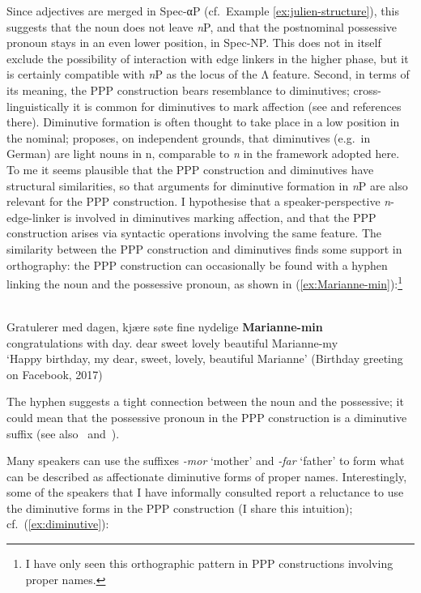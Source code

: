 \documentclass[output=paper]{langsci/langscibook}
\begin{document}
\noindent Since adjectives are merged in Spec-α{}P (cf.\ Example
\eqref{ex:julien-structure}), this suggests that the noun does not leave
\emph{n}P, and that the postnominal possessive pronoun stays in an even lower
position, in Spec-NP.  This does not in itself  exclude the possibility of
interaction with edge linkers in the higher phase, but it is certainly
compatible with \emph{n}P as  the locus of the
\textsc{Λ} feature.  Second, in terms
of its meaning, the PPP construction bears  resemblance to diminutives;
cross-linguistically it is common for diminutives to mark affection  (see
\citealt{jurafsky1996diminutives} and references there).  Diminutive
formation is often thought to take place in a low position in the nominal;
\citet{wiltschko2006diminutives} proposes, on independent grounds, that
diminutives (e.g.\ in German) are light nouns in n, comparable to \emph{n} in
the framework adopted here. To me it seems plausible that the PPP construction
and diminutives have structural similarities, so that arguments for diminutive
formation in \emph{n}P are also relevant for the PPP construction. I
hypothesise that a speaker-perspective
\emph{n}-edge-linker is involved in diminutives marking affection, and  that
the PPP construction arises via syntactic operations involving the same
feature. The similarity between the PPP construction and diminutives finds some
support in orthography: the PPP construction can occasionally  be found with a
hyphen linking the noun and the possessive pronoun, as shown in
(\ref{ex:Marianne-min}):\footnote{I have only seen this orthographic pattern in
PPP constructions involving proper names.}

\ea\label{ex:Marianne-min} \\
	\gll 	Gratulerer med dagen, kjære søte fine nydelige \textbf{Marianne-min}\\
	congratulations with day.\Def{} dear sweet lovely beautiful Marianne-my\\
	\glt `Happy birthday, my dear, sweet, lovely, beautiful Marianne'
	 (Birthday greeting on Facebook, 2017)
\z

\noindent The hyphen suggests a tight connection between the noun and the
possessive; it could mean that the possessive pronoun in the \gls{PPP} construction
is a diminutive suffix (see also~\citealt{Lodrup2011}
and~\citealt{Svenonius2017}).

Many  speakers can use the suffixes \emph{-mor} `mother' and
\emph{-far} `father' to  form what can be described as affectionate diminutive
forms of proper names. Interestingly, some of the speakers that I have
informally consulted  report a reluctance to use the diminutive forms in the
PPP construction (I share this intuition); cf.\
(\ref{ex:diminutive}):
\end{document}
